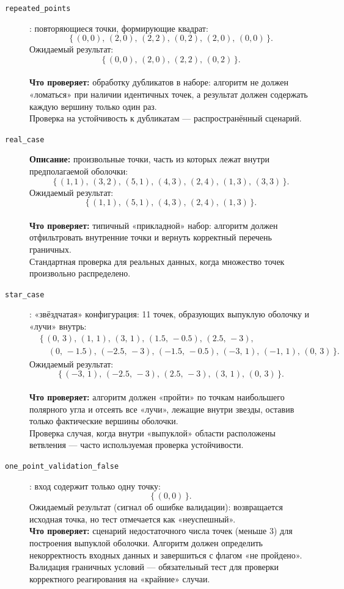 \documentclass[12pt,a4paper]{article}
\begin{document}
\begin{description}
  \item[\texttt{repeated\_points}]: повторяющиеся точки, формирующие квадрат:
    \[
      \{\, (0,0),\,(2,0),\,(2,2),\,(0,2),\,(2,0),\,(0,0) \,\}.
    \]
    Ожидаемый результат:
    \[
      \{\, (0,0),\,(2,0),\,(2,2),\,(0,2) \,\}.
    \]
    \\
    \textbf{Что проверяет:} 
    обработку дубликатов в наборе: алгоритм не должен «ломаться» при наличии идентичных точек, а результат должен содержать каждую вершину только один раз.  
    \\
    Проверка на устойчивость к дубликатам — распространённый сценарий.

  \item[\texttt{real\_case}] 
    \textbf{Описание:} 
    произвольные точки, часть из которых лежат внутри предполагаемой оболочки:
    \[
      \{\, (1,1),\,(3,2),\,(5,1),\,(4,3),\,(2,4),\,(1,3),\,(3,3) \,\}.
    \]
    Ожидаемый результат:
    \[
      \{\, (1,1),\,(5,1),\,(4,3),\,(2,4),\,(1,3) \,\}.
    \]
    \\
    \textbf{Что проверяет:} 
    типичный «прикладной» набор: алгоритм должен отфильтровать внутренние точки и вернуть корректный перечень граничных.  
    \\
    Стандартная проверка для реальных данных, когда множество точек произвольно распределено.

  \item[\texttt{star\_case}]: «звёздчатая» конфигурация: 11 точек, образующих выпуклую оболочку и «лучи» внутрь:
    \[
      \begin{aligned}
        &\{\, (0,\,3),\,(1,\,1),\,(3,\,1),\,(1.5,\,-0.5),\,(2.5,\,-3), \\
        &\quad (0,\,-1.5),\,(-2.5,\,-3),\,(-1.5,\,-0.5),\,(-3,\,1),\,(-1,\,1),\,(0,\,3) \,\}.
      \end{aligned}
    \]
    Ожидаемый результат:
    \[
      \{\, (-3,\,1),\,(-2.5,\,-3),\,(2.5,\,-3),\,(3,\,1),\,(0,\,3) \,\}.
    \]
    \\
    \textbf{Что проверяет:} 
    алгоритм должен «пройти» по точкам наибольшего полярного угла и отсеять все «лучи», лежащие внутри звезды, оставив только фактические вершины оболочки.  
    \\
    Проверка случая, когда внутри «выпуклой» области расположены ветвления — часто используемая проверка устойчивости.

  \item[\texttt{one\_point\_validation\_false}]: вход содержит только одну точку:
    \[
      \{\, (0,0) \,\}.
    \]
    Ожидаемый результат (сигнал об ошибке валидации): возвращается исходная точка, но тест отмечается как «неуспешный».  
    \\
    \textbf{Что проверяет:} 
    сценарий недостаточного числа точек (меньше 3) для построения выпуклой оболочки. Алгоритм должен определить некорректность входных данных и завершиться с флагом «не пройдено».  
    \\
    Валидация граничных условий — обязательный тест для проверки корректного реагирования на «крайние» случаи.


\end{description}
\end{document}
